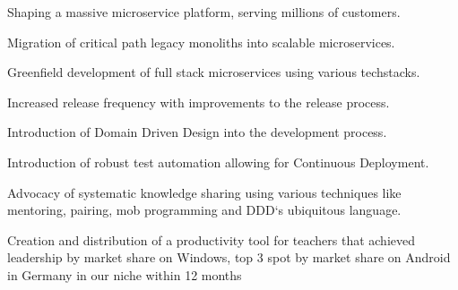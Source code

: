 \documentclass[]{resume}
\begin{document}
\begin{minipage}[t]{0.64\textwidth}
\begin{tightemize}
\item Shaping a massive microservice platform, serving millions of customers.
\item Migration of critical path legacy monoliths into scalable microservices.
\item Greenfield development of full stack microservices using various techstacks.
\item Increased release frequency with improvements to the release process.
\item Introduction of Domain Driven Design into the development process.
\item Introduction of robust test automation allowing for Continuous Deployment.
\item Advocacy of systematic knowledge sharing using various techniques like mentoring, pairing, mob programming and DDD`s ubiquitous language.
\end{tightemize}
\sectionsep

\vspace{\topsep} %
Creation and distribution of a productivity tool for teachers that achieved leadership by market share on Windows, top 3 spot by market share on Android in Germany in our niche within 12 months
\sectionsep

\sectionsep

\sectionsep

\sectionsep

\sectionsep

\end{minipage} 
\end{document}
